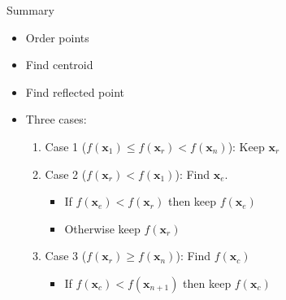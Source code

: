 \documentclass[10pt]{beamer}
\begin{document}
                                                                                              \begin{frame}{Summary}
                                                                                                \begin{itemize}
                                                                                                \item Order points
                                                                                                \item Find centroid
                                                                                                \item Find reflected point
                                                                                                \item Three cases:
                                                                                                  \begin{enumerate}
                                                                                                  \item Case 1 ($f({\bm x_1})\leq f({\bm x_r})<f({\bm x_n})$): Keep ${\bm x_r}$
                                                                                                  \item Case 2 ($f({\bm x_r}) < f({\bm x_1})$): Find ${\bm x_e}$.
                                                                                                    \begin{itemize}
                                                                                                    \item If $f({\bm x_e})<f({\bm x_r})$ then keep $f({\bm x_e})$
                                                                                                    \item Otherwise keep $f({\bm x_r})$
                                                                                                    \end{itemize}
                                                                                                  \item Case 3 ($f({\bm x_r})\geq f({\bm x_n})$): Find $f({\bm x_c})$
                                                                                                    \begin{itemize}
                                                                                                    \item If $f({\bm x_c})<f({\bm x_{n+1}})$ then keep $f({\bm x_{c}})$

\end{itemize}
\end{enumerate}
\end{itemize}
\end{frame}
\end{document}
